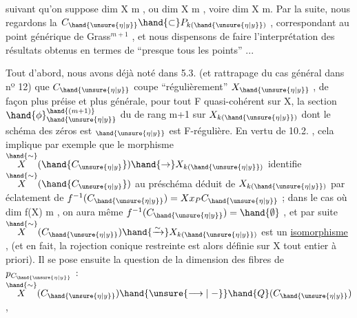 
suivant qu'on suppose  dim X \hand{$\geqslant$} m , ou  dim X \hand{$\leqslant$} m , voire dim X \hand{$<$} m.
Par la suite, nous regardons la $C_{\hand{\unsure{\eta|y}}}\hand{\subset} P_{k(\hand{\unsure{\eta|y}})}$ , correspondant au point
générique  de  Grass$^{m+1}$ , et nous dispensons  de faire l'interprétation
des résultats obtenus en termes de  ``presque tous les points'' ...

Tout d'abord, nous avons déjà noté dans 5.3. (et rattrapage du
cas général dans nº 12)  que $C_{\hand{\unsure{\eta|y}}}$  coupe ``régulièrement'' $X_{\hand{\unsure{\eta|y}}}$ , de façon
plus préise et plus générale, pour tout F quasi-cohérent sur X,
la section $\hand{\phi}_{\hand{\unsure{\eta|y}}}^{\hand{(m+1)}}$ du  de rang  m+1  sur  $X_{k(\hand{\unsure{\eta|y}})}$  dont le
schéma des zéros est $_{\hand{\unsure{\eta|y}}}$  est F-régulière. En vertu de 10.2. , cela
implique par exemple que le morphisme  $\overset{\hand{\sim}}{X}(\hand{C_{\unsure{\eta|y}}})\hand{\to} X_{k(\hand{\unsure{\eta|y}})}$ identifie $\overset{\hand{\sim}}{X}(\hand{C_{\unsure{\eta|y}}})$ au préschéma
déduit de $X_{k(\hand{\unsure{\eta|y}})}$ par éclatement de $f^{-1}(C_{\hand{\unsure{\eta|y}}})= Xx_P C_{\hand{\unsure{\eta|y}}}$ ;   dans le cas
où  dim f(X) \hand{$\leqslant$} m ,  on  aura même  $f^{-1}(C_{\hand{\unsure{\eta|y}}}) = \hand{\emptyset}$ , et  par suite
$\overset{\hand{\sim}}{X}(C_{\hand{\unsure{\eta|y}}}) \hand{\xrightarrow{\sim}} X_{k(\hand{\unsure{\eta|y}})}$  est un \uline{isomorphisme} , (et en fait, la rojection conique
restreinte  est alors définie sur X tout entier à priori). Il se pose
ensuite la question de la dimension des fibres de $p_{C_{\hand{\unsure{\eta|y}}}}$ : $\overset{\hand{\sim}}{X}(C_{\hand{\unsure{\eta|y}}}) \hand{\unsure{\longrightarrow|\relbar}} \hand{Q}(C_{\hand{\unsure{\eta|y}}})$,
